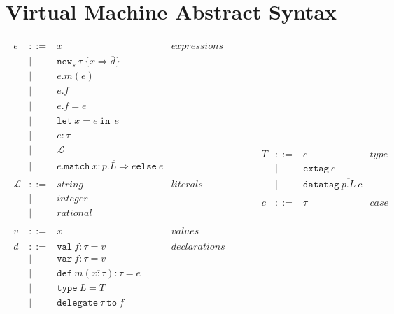 \documentclass{article}
\newcommand{\keywadj}[1]{\mathtt{#1}}
\newcommand{\keyw}[1]{\keywadj{#1}~}
\begin{document}
\section{Virtual Machine Abstract Syntax}

\[
\begin{array}{lll}
\begin{array}{lllr}
e & ::= & x & expressions \\
& | & \keywadj{new}_{s}~\tau~\{x \Rightarrow \overline{d}\}&\\
& | & e.m(e) &\\
& | & e.f &\\
& | & e.f = e&\\
& | & \keyw{let} x=e~\keyw{in}~e &\\
& | & e : \tau&\\
& | & \mathscr{L} &\\
& | & e.\keyw{match} \overline{x:p.L \Rightarrow e} \keyw{else} e &\\
&&\\
\mathscr{L} & ::= & string & literals \\
& | & integer &\\
& | & rational &\\
&&\\
v & ::= & x & values \\
&&\\
d & ::= & \keyw{val} f : \tau = v & declarations \\
  & |   & \keyw{var} f : \tau = v &\\
  & |   & \keyw{def} m(\overline{x:\tau}) : \tau = e &\\
  & |   & \keyw{type} L = T &\\
  & |   & \keyw{delegate} \tau~\keyw{to} f &\\
&&\\
\end{array}
& ~~~~~~
&
\begin{array}{lllr}
T & ::= & c & \textit{type desc.}\\
& | & \keyw{extag} c &\\
& | & \keyw{datatag} \overline{p.L}~c &\\
&&\\
c & ::= & \tau & \textit{case desc.} \\

\end{array}
\end{array}\]
\end{document}
